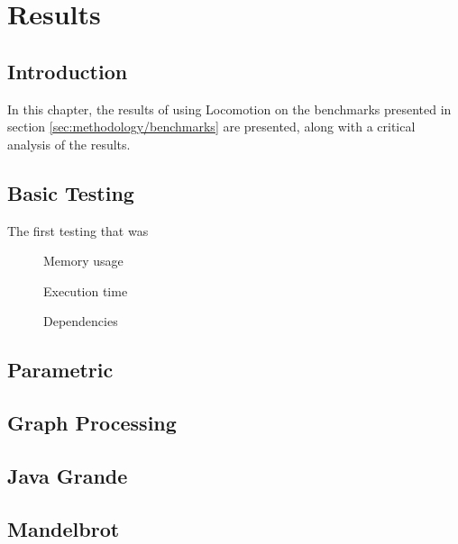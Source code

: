 \chapter{Results} \label{chp:results}
\section{Introduction} \label{sec:results/introduction}
In this chapter, the results of using Locomotion on the benchmarks presented in section \ref{sec:methodology/benchmarks} are presented, along with a critical analysis of the results.

\section{Basic Testing} \label{sec:results/basic}
The first testing that was

\begin{figure}[H]
	\centering
	\caption{Memory usage}
\end{figure}

\begin{figure}[H]
	\centering
	\caption{Execution time}
\end{figure}

\begin{figure}[H]
	\centering
	\caption{Dependencies}
\end{figure}

\section{Parametric} \label{sec:results/parametric}

\section{Graph Processing} \label{sec:results/graph}

\section{Java Grande} \label{sec:results/grande}

\section{Mandelbrot} \label{sec:results/mandelbrot}

